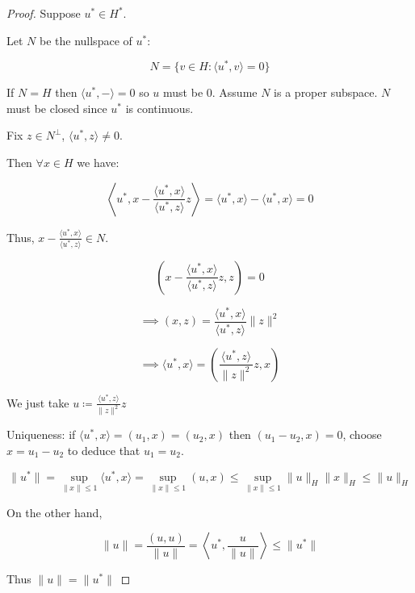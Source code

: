 \documentclass{article}
\theoremstyle{definition}
\begin{document}
\begin{proof}
    Suppose \(u^{\ast} \in H^{\ast}\).

    Let \(N\) be the nullspace of \(u^{\ast}\):

    \[
        N = \{ v\in H : \langle u^{\ast} , v \rangle = 0 \} 
    \]

    If \(N = H\) then \(\langle u^{\ast}, - \rangle = 0\) so \(u\) must be \(0\). Assume \(N\) is a proper subspace. \(N\) must be closed since \(u^{\ast}\) is continuous.

    Fix \(z\in N ^{\perp}\), \(\langle u^{\ast} , z \rangle \neq 0\).

    Then \(\forall x\in H\) we have:

    \[
        \left\langle u^{\ast} , x - \frac{\langle u^{\ast} , x \rangle}{\langle u^{\ast} , z \rangle } z \right\rangle = \langle u^{\ast} , x \rangle - \langle u^{\ast} , x \rangle = 0
    \]

    Thus, \(x - \frac{\langle u^{\ast} , x \rangle}{\langle u^{\ast} , z \rangle } \in N\).
    
    \[
        \left( x - \frac{\langle u^{\ast} , x \rangle}{\langle u^{\ast} , z \rangle} z, z \right) = 0
    \]

    \[
        \implies (x,z) = \frac{\langle u^{\ast} , x \rangle}{\langle u^{\ast} , z \rangle} \lVert z \rVert ^2
    \]

    \[
        \implies \langle u^{\ast} , x \rangle = \left( \frac{\langle u^{\ast} ,z \rangle}{\lVert z \rVert ^2}z, x \right) 
    \]

    We just take \(u \coloneqq \frac{\langle u^{\ast} , z \rangle}{\lVert z \rVert^2}z\)
    
    Uniqueness: if \(\langle u^{\ast} , x \rangle = (u_1, x) = (u_2,x)\) then \((u_1 - u_2, x) = 0\), choose \(x = u_1 - u_2\) to deduce that \(u_1 = u_2\).

    \[
        \lVert u^{\ast} \rVert =\sup_{\lVert x \rVert \leq 1} \langle u^{\ast} , x \rangle = \sup_{\lVert x \rVert \leq 1} (u,x) \leq \sup_{\lVert x \rVert \leq 1} \lVert u \rVert _H \lVert x \rVert _H \leq \lVert u \rVert _H
    \]

    On the other hand,

    \[
        \lVert u \rVert = \frac{(u,u)}{\lVert u \rVert } = \left\langle u^{\ast} , \frac{u}{\lVert u \rVert } \right\rangle \leq \lVert u^{\ast} \rVert 
    \]

    Thus \(\lVert u \rVert = \lVert u^{\ast} \rVert \) 

\end{proof}
\end{document}
